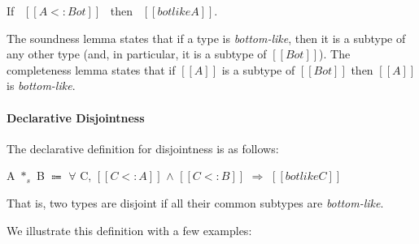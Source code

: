\begin{lemma}
  If \ $[[A <: Bot]]$ \ then \ $[[botlike A]]$.
\label{lemma:union:bl-completeness}
\end{lemma}

\noindent The soundness lemma states that if a type is \emph{bottom-like}, then it is
a subtype of any other type (and, in particular, it is a subtype of $[[Bot]]$).
The completeness lemma states that if $[[A]]$ is a subtype of $[[Bot]]$ then
$[[A]]$ is \emph{bottom-like}.

\begin{comment}
\begin{proof}
  By induction on type $[[A]]$.
  \begin{itemize}
    \item Cases $[[Top]]$, $[[Bot]]$, $[[Int]]$ and $[[A -> B]]$ are trivial to prove.
    \item Case $[[A \/ B]]$ requires \Cref{lemma:union:sub-or}.
  \end{itemize}
\end{proof}
\end{comment}

\paragraph{Declarative Disjointness}
The declarative definition for disjointness is as follows:

\begin{definition}
  A $*_s$ B $\Coloneqq$ $\forall$ C, $[[C <: A]]$ $\wedge$ $[[C <: B]]$ $\Longrightarrow$ $[[botlike C]]$
\label{def:union:disj}
\end{definition}

\noindent That is, two types are disjoint if all their common subtypes are \emph{bottom-like}.
\begin{comment}
With this definition we have that different primitive types are disjoint. For example
$[[Int]] * [[Bool]]$ since the only common subtypes of $[[Int]]$ and $[[Bool]]$
are bottom-like. A more interesting case is the disjointness of two function types.
It turns out that function types are never disjoint, since we can always find
a common subtype for any two function types. For example, if we have $[[Int -> Bool]]$
and $[[String -> Char]]$ then a common subtype that is not bottom-like is
$[[Top -> Bot]]$. Therefore, $[[Int -> Bool]]$ and $[[String -> Char]]$ are not
disjoint.

\noindent Reader may think at this point that $[[Bot]]$ type can simply be used in \Cref{def:union:disj}
instead of $[[botlike C]]$ in the conclusion. Answer to this question is
union type with $[[Bot]]$ as all primitive types is also a least subtype in \cal.
$[[botlike C]]$ also handles this case.
\end{comment}
We illustrate this definition with a few examples:

